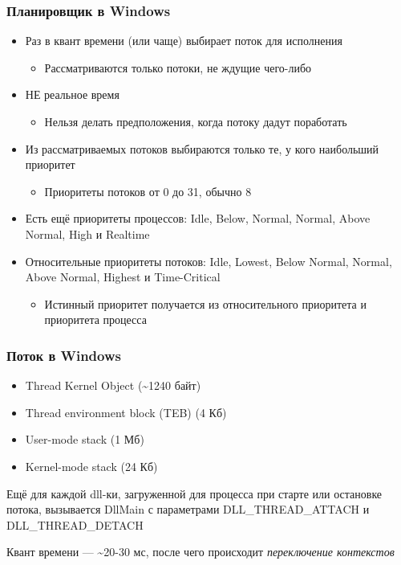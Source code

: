 \documentclass{../../slides-style}
\begin{document}
    \begin{frame}
        \frametitle{Планировщик в Windows}
        \begin{itemize}
            \item Раз в квант времени (или чаще) выбирает поток для исполнения
            \begin{itemize}
                \item Рассматриваются только потоки, не ждущие чего-либо
            \end{itemize}
            \item НЕ реальное время
            \begin{itemize}
                \item Нельзя делать предположения, когда потоку дадут поработать
            \end{itemize}
            \item Из рассматриваемых потоков выбираются только те, у кого наибольший приоритет
            \begin{itemize}
                \item Приоритеты потоков от 0 до 31, обычно 8
            \end{itemize}
            \item Есть ещё приоритеты процессов: Idle, Below, Normal, Normal, Above Normal, High и Realtime
            \item Относительные приоритеты потоков: Idle, Lowest, Below Normal, Normal, Above Normal, Highest и Time-Critical
            \begin{itemize}
                \item Истинный приоритет получается из относительного приоритета и приоритета процесса
            \end{itemize}
        \end{itemize}
    \end{frame}

    \begin{frame}
        \frametitle{Поток в Windows}
        \begin{itemize}
            \item Thread Kernel Object (\textasciitilde1240 байт)
            \item Thread environment block (TEB) (4 Кб)
            \item User-mode stack (1 Мб)
            \item Kernel-mode stack (24 Кб)
        \end{itemize}

        Ещё для каждой dll-ки, загруженной для процесса при старте или остановке потока, вызывается DllMain с параметрами DLL\_THREAD\_ATTACH и DLL\_THREAD\_DETACH

        \vspace{3mm}
        Квант времени --- \textasciitilde20-30 мс, после чего происходит \textit{переключение контекстов}
    \end{frame}
\end{document}

